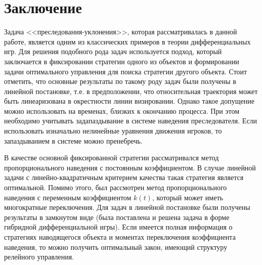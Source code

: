 \documentclass[a4paper,12pt, openany]{book}
\theoremstyle{plain} %
\theoremstyle{definition} %
\theoremstyle{remark} %
\numberwithin{equation}{chapter}
\begin{document}
{%





\chapter*{Заключение}


Задача <<преследования-уклонения>>, которая рассматривалась в данной работе, является одним из классических примеров в теории дифференциальных игр. Для решения подобного рода задач используется подход, который заключается в фиксировании стратегии одного из объектов и формировании задачи оптимального управления для поиска стратегии другого объекта. Стоит отметить, что основные результаты по такому роду задач были получены в линейной постановке, т.е. в предположении, что относительная траектория может быть линеаризована в окрестности линии визировании. Однако такое допущение можно использовать на временах, близких к окончанию процесса. При этом необходимо учитывать задапаздывание в системе наведения преследователя. Если использовать изначально нелинейные уравнения движения игроков, то запаздыванием в системе можно пренебречь. 

В качестве основной фиксированной стратегии рассматривался метод пропорционального наведения с постоянным коэффициентом. В случае линейной задачи с линейно-квадратичным критерием качества такая стратегия является оптимальной. Помимо этого, был рассмотрен метод пропорционального наведения с переменным коэффициентом $k(t)$, который может иметь многократные переключения. Для задач в линейной постановке были получены результаты в замкнутом виде (была поставлена и решена задача в форме гибридной дифференциальной игры). Если имеется полная информация о стратегиях наводящегося объекта и моментах переключения коэффициента наведения, то можно получить оптимальный закон, имеющий структуру релейного управления. 

}
\end{document}
